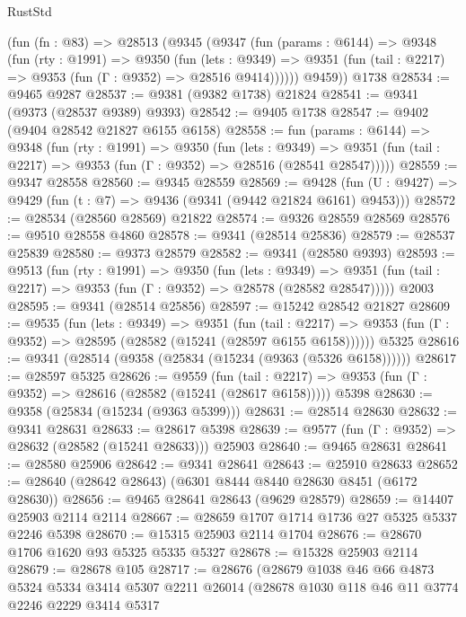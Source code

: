 \begin{lexlean}{RustStd}
\begin{coremodule}
    (fun (fn : @83) =>
    @28513
      (@9345
        (@9347
          (fun (params : @6144) =>
          @9348
            (fun (rty : @1991) =>
            @9350
              (fun (lets : @9349) =>
              @9351 (fun (tail : @2217) => @9353 (fun (Γ : @9352) => @28516 @9414))))))
        @9459))
    @1738
@28534 := @9465 @9287
@28537 := @9381 (@9382 @1738) @21824
@28541 := @9341 (@9373 (@28537 @9389) @9393)
@28542 := @9405 @1738
@28547 := @9402 (@9404 @28542 @21827 @6155 @6158)
@28558 := fun (params : @6144) =>
  @9348
    (fun (rty : @1991) =>
    @9350
      (fun (lets : @9349) =>
      @9351 (fun (tail : @2217) => @9353 (fun (Γ : @9352) => @28516 (@28541 @28547)))))
@28559 := @9347 @28558
@28560 := @9345 @28559
@28569 := @9428
    (fun (U : @9427) => @9429 (fun (t : @7) => @9436 (@9341 (@9442 @21824 @6161) @9453)))
@28572 := @28534 (@28560 @28569) @21822
@28574 := @9326 @28559 @28569
@28576 := @9510 @28558 @4860
@28578 := @9341 (@28514 @25836)
@28579 := @28537 @25839
@28580 := @9373 @28579
@28582 := @9341 (@28580 @9393)
@28593 := @9513
    (fun (rty : @1991) =>
    @9350
      (fun (lets : @9349) =>
      @9351 (fun (tail : @2217) => @9353 (fun (Γ : @9352) => @28578 (@28582 @28547)))))
    @2003
@28595 := @9341 (@28514 @25856)
@28597 := @15242 @28542 @21827
@28609 := @9535
    (fun (lets : @9349) =>
    @9351
      (fun (tail : @2217) =>
      @9353 (fun (Γ : @9352) => @28595 (@28582 (@15241 (@28597 @6155 @6158))))))
    @5325
@28616 := @9341 (@28514 (@9358 (@25834 (@15234 (@9363 (@5326 @6158))))))
@28617 := @28597 @5325
@28626 := @9559
    (fun (tail : @2217) => @9353 (fun (Γ : @9352) => @28616 (@28582 (@15241 (@28617 @6158)))))
    @5398
@28630 := @9358 (@25834 (@15234 (@9363 @5399)))
@28631 := @28514 @28630
@28632 := @9341 @28631
@28633 := @28617 @5398
@28639 := @9577 (fun (Γ : @9352) => @28632 (@28582 (@15241 @28633))) @25903
@28640 := @9465 @28631
@28641 := @28580 @25906
@28642 := @9341 @28641
@28643 := @25910 @28633
@28652 := @28640 (@28642 @28643) (@6301 @8444 @8440 @28630 @8451 (@6172 @28630))
@28656 := @9465 @28641 @28643 (@9629 @28579)
@28659 := @14407 @25903 @2114 @2114
@28667 := @28659 @1707 @1714 @1736 @27 @5325 @5337 @2246 @5398
@28670 := @15315 @25903 @2114 @1704
@28676 := @28670 @1706 @1620 @93 @5325 @5335 @5327
@28678 := @15328 @25903 @2114
@28679 := @28678 @105
@28717 := @28676
    (@28679
      @1038
      @46
      @66
      @4873
      @5324
      @5334
      @3414
      @5307
      @2211
      @26014
      (@28678
        @1030
        @118
        @46
        @11
        @3774
        @2246
        @2229
        @3414
        @5317

\end{coremodule}
\end{lexlean}
